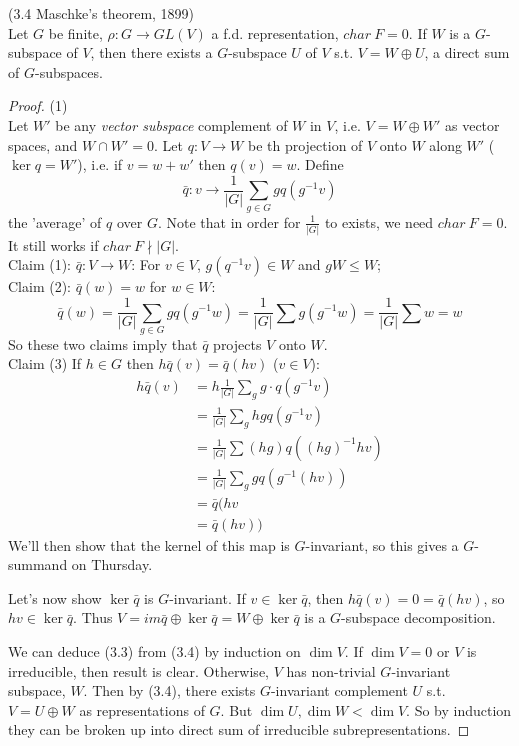 \documentclass[a4paper]{article}
\begin{document}
\begin{thm} (3.4 Maschke's theorem, 1899)\\
Let $G$ be finite, $\rho:G \to GL(V)$ a f.d. representation, $char\ F = 0$. If $W$ is a $G$-subspace of $V$, then there exists a $G$-subspace $U$ of $V$ s.t. $V = W \oplus U$, a direct sum of $G$-subspaces.
\begin{proof} (1)\\
Let $W'$ be any \emph{vector subspace} complement of $W$ in $V$, i.e. $V=W \oplus W'$ as vector spaces, and $W \cap W'=0$. Let $q:V \to W$ be th projection of $V$ onto $W$ along $W'$ ($\ker q = W'$), i.e. if $v=w+w'$ then $q(v) = w$. Define $$\bar{q} : v \to \frac{1}{|G|} \sum_{g \in G} g q(g^{-1}v)$$the 'average' of $q$ over $G$. Note that in order for $\frac{1}{|G|}$ to exists, we need $char\ F = 0$. It still works if $char\ F \nmid |G|$.\\
Claim (1): $\bar{q}:V \to W$: For $v \in V$, $g(q^{-1}v) \in W$ and $gW \leq W$;\\
Claim (2): $\bar{q}(w) = w$ for $w \in W$: $$\bar{q}(w) = \frac{1}{|G|} \sum_{g \in G} gq(g^{-1}w) = \frac{1}{|G|} \sum g(g^{-1}w) = \frac{1}{|G|} \sum w = w$$
So these two claims imply that $\bar{q}$ projects $V$ onto $W$.\\
Claim (3) If $h \in G$ then $h\bar{q}(v) = \bar{q}(hv)$ ($v \in V$):
\begin{equation*}
\begin{aligned}
h\bar{q}(v) &= h\frac{1}{|G|} \sum_g g \cdot q(g^{-1} v)\\
&= \frac{1}{|G|} \sum_g hgq(g^{-1} v)\\
&= \frac{1}{|G|} \sum (hg) q((hg)^{-1} hv)\\
&= \frac{1}{|G|} \sum_g gq(g^{-1}(hv))\\
&= \bar{q}(hv\\
&= \bar{q}(hv))
\end{aligned}
\end{equation*}
We'll then show that the kernel of this map is $G$-invariant, so this gives a $G$-summand on Thursday.

Let's now show $\ker \bar{q}$ is $G$-invariant. If $v \in \ker \bar{q}$, then $h\bar{q}(v) = 0 = \bar{q}(hv)$, so $hv \in \ker \bar{q}$. Thus $V = im \bar{q} \oplus \ker \bar{q} = W \oplus \ker \bar{q}$ is a $G$-subspace decomposition.

We can deduce (3.3) from (3.4) by induction on $\dim V$. If $\dim V = 0$ or $V$ is irreducible, then result is clear. Otherwise, $V$ has non-trivial $G$-invariant subspace, $W$. Then by (3.4), there exists $G$-invariant complement $U$ s.t. $V = U \oplus W$ as representations of $G$. But $\dim U, \dim W < \dim V$. So by induction they can be broken up into direct sum of irreducible subrepresentations.
\end{proof}


\end{thm}
\end{document}

